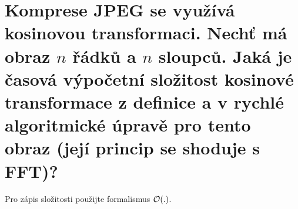 \section{Komprese JPEG se využívá kosinovou transformaci. Nechť má obraz \texorpdfstring{$n$}{n} řádků a 
\texorpdfstring{$n$}{n} sloupců. Jaká je časová výpočetní složitost kosinové transformace z definice a v rychlé 
algoritmické úpravě pro tento obraz (její princip se shoduje s FFT)?}
Pro zápis složitosti použijte formalismus $\mathcal{O}(.)$.